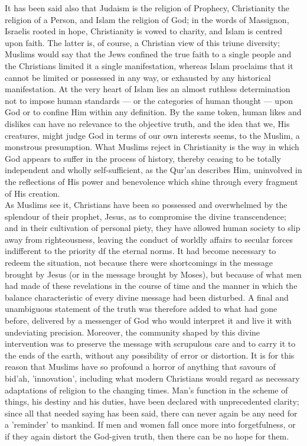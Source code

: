 \documentclass[10pt, twoside]{book}
\begin{document}
It has been said also that Judaism is the religion of Prophecy, Christianity the religion of a 
Person, and Islam the religion of God; in the words of Massignon, Israelis rooted in hope, 
Christianity is vowed to charity, and Islam is centred upon faith. The latter is, of course, a 
Christian view of this triune diversity; Muslims would say that the Jews confined the true faith to a 
single people and the Christians limited it a single manifestation, whereas Islam proclaims that it 
cannot be limited or possessed in any way, or exhausted by any historical manifestation. At the very 
heart of Islam lies an almost ruthless determination not to impose human standards --- or the 
categories of human thought --- upon God or to confine Him within any definition. By the same token, 
human likes and dislikes can have no relevance to the objective truth, and the idea that we, His 
creatures, might judge God in terms of our own interests seems, to the Muslim, a monstrous 
presumption. What Muslims reject in Christianity is the way in which God appears to suffer in the 
process of history, thereby ceasing to be totally independent and wholly self\hyp{}sufficient, as the 
Qur'an describes Him, uninvolved in the reflections of His power and benevolence which shine through 
every fragment of His creation. \\

As Muslims see it, Christians have been so possessed and overwhelmed by the splendour of their 
prophet, Jesus, as to compromise the divine transcendence; and in their cultivation of personal 
piety, they have allowed human society to slip away from righteousness, leaving the conduct of 
worldly affairs to secular forces indifferent to the priority df the eternal norms. It had become 
necessary to redeem the situation, not because there were shortcomings in the message brought by 
Jesus (or in the message brought by Moses), but because of what men had made of these revelations in 
the course of time and the manner in which the balance characteristic of every divine message had 
been disturbed. A final and unambiguous statement of the truth was therefore added to what had gone 
before, delivered by a messenger of God who would interpret it and live it with undeviating 
precision. Moreover, the community shaped by this divine intervention was to preserve the message 
with scrupulous care and to carry it to the ends of the earth, without any possibility of error or 
distortion. It is for this reason that Muslims have so profound a horror of anything that savours of 
bid'ah, 'innovation', including what modern Christians would regard as necessary adaptations of 
religion to the changing times. Man's function in the scheme of things, his destiny and his duties, 
have been declared with unprecedented clarity; since all that needed saying has been said, there can 
never again be any need for a 'reminder' to mankind. If men and women fall once more into 
forgetfulness, or if they again distort the God\hyp{}given truth, then there can be no hope for them. \\
\end{document}
